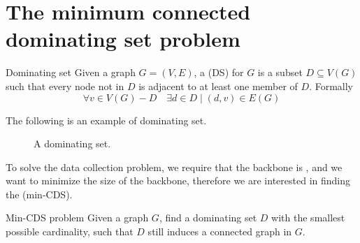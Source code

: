 \documentclass[a4paper, 12pt]{report}
\begin{document}
    \section{The minimum connected dominating set problem}

    \begin{frameddefn}{Dominating set}
        Given a graph $G = (V, E)$, a  (DS) for $G$ is a subset $D \subseteq V(G)$ such that every node not in $D$ is adjacent to at least one member of $D$. Formally $$\forall v \in V(G) - D \quad \exists d \in D \mid (d, v) \in E(G)$$
    \end{frameddefn}

    \begin{example} \label{dom set}
        The following is an example of dominating set.

        \begin{figure}[H]
            \centering
            \caption{A dominating set.}
        \end{figure}
    \end{example}

    To solve the data collection problem, we require that the backbone is , and we want to minimize the size of the backbone, therefore we are interested in finding the  (min-CDS).

    \begin{frameddefn}{Min-CDS problem}
        Given a graph $G$, find a dominating set $D$ with the smallest possible cardinality, such that $D$ still induces a connected graph in $G$.
    \end{frameddefn}
\end{document}
